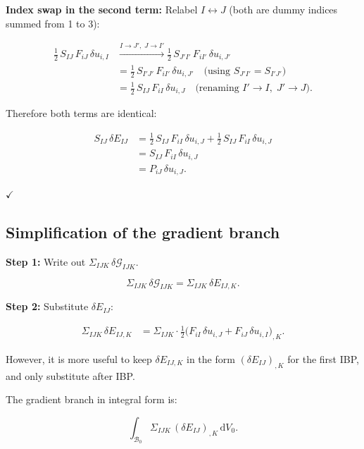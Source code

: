 \documentclass[11pt]{article}
\begin{document}
\textbf{Index swap in the second term:}
Relabel $I\leftrightarrow J$ (both are dummy indices summed from 1 to 3):

\begin{align}
\tfrac12\,S_{IJ}\,F_{iJ}\,\delta u_{i,I}
&\xrightarrow{I\to J',\;J\to I'}
\tfrac12\,S_{J'I'}\,F_{iI'}\,\delta u_{i,J'}
\nonumber\\
&= \tfrac12\,S_{I'J'}\,F_{iI'}\,\delta u_{i,J'}
\quad\text{(using }S_{J'I'}=S_{I'J'}\text{)}
\nonumber\\
&= \tfrac12\,S_{IJ}\,F_{iI}\,\delta u_{i,J}
\quad\text{(renaming }I'\to I,\;J'\to J\text{)}.
\end{align}

Therefore both terms are identical:

\begin{align}
S_{IJ}\,\delta E_{IJ}
&= \tfrac12\,S_{IJ}\,F_{iI}\,\delta u_{i,J}
 + \tfrac12\,S_{IJ}\,F_{iI}\,\delta u_{i,J}
\nonumber\\
&= S_{IJ}\,F_{iI}\,\delta u_{i,J}
\nonumber\\
&= P_{iJ}\,\delta u_{i,J}.
\end{align}

$\checkmark$

\subsection{Simplification of the gradient branch}

\textbf{Step 1:} Write out $\Sigma_{IJK}\,\delta\mathcal{G}_{IJK}$.

\begin{equation}
\Sigma_{IJK}\,\delta\mathcal{G}_{IJK}
= \Sigma_{IJK}\,\delta E_{IJ,K}.
\end{equation}

\textbf{Step 2:} Substitute $\delta E_{IJ}$:

\begin{align}
\Sigma_{IJK}\,\delta E_{IJ,K}
&= \Sigma_{IJK}\cdot
   \tfrac12\bigl(F_{iI}\,\delta u_{i,J}
              + F_{iJ}\,\delta u_{i,I}\bigr)_{,K}.
\end{align}

However, it is more useful to keep $\delta E_{IJ,K}$ in the form
$(\delta E_{IJ})_{,K}$ for the first IBP, and only substitute
after IBP.

The gradient branch in integral form is:

\begin{equation}
\int_{\mathcal{B}_{0}}\Sigma_{IJK}\,(\delta E_{IJ})_{,K}\,
  \mathrm{d}V_{0}.
\end{equation}
\end{document}
